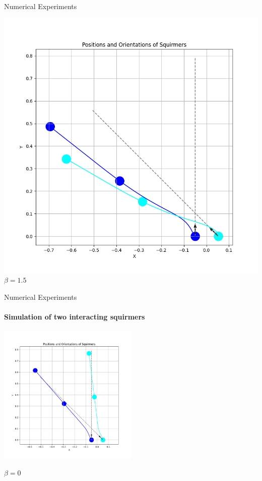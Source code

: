 \documentclass{beamer}
\begin{document}
\begin{frame}{Numerical Experiments}
\begin{minipage}{0.49\textwidth}
        \includegraphics[width=1\textwidth]{../../graphs/simulations/sim_sq_sq/beta1_5/3pi_4_.png}
        $\beta = 1.5$
    \end{minipage}
\end{frame}

\begin{frame}{Numerical Experiments}
    \framesubtitle{Simulation of two interacting squirmers}
    \centering
    \includegraphics[width=0.5\textwidth]{../../graphs/simulations/sim_sq_sq/beta0/3pi_4_.png}
    \begin{center}
        $\beta = 0$
    \end{center}
\end{frame}
\end{document}
